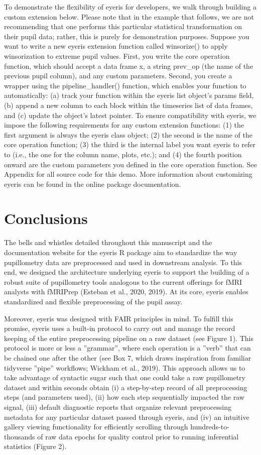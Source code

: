 To demonstrate the flexibility of eyeris for developers, we walk through building a custom extension below. Please note that in the example that follows, we are not recommending that one performs this particular statistical transformation on their pupil data; rather, this is purely for demonstration purposes. Suppose you want to write a new eyeris extension function called winsorize() to apply winsorization to extreme pupil values. First, you write the core operation function, which should accept a data frame x, a string prev\_op (the name of the previous pupil column), and any custom parameters. Second, you create a wrapper using the pipeline\_handler() function, which enables your function to automatically: (a) track your function within the eyeris list object’s params field, (b) append a new column to each block within the timeseries list of data frames, and (c) update the object’s latest pointer. To ensure compatibility with eyeris, we impose the following requirements for any custom extension functions: (1) the first argument is always the eyeris class object; (2) the second is the name of the core operation function; (3) the third is the internal label you want eyeris to refer to (i.e., the one for the column name, plots, etc.); and (4) the fourth position onward are the custom parameters you defined in the core operation function. See Appendix for all source code for this demo. More information about customizing eyeris can be found in the online package documentation.

\section{Conclusions}
The bells and whistles detailed throughout this manuscript and the documentation website for the eyeris R package aim to standardize the way pupillometry data are preprocessed and used in downstream analysis. To this end, we designed the architecture underlying eyeris to support the building of a robust suite of pupillometry tools analogous to the current offerings for fMRI analysts with fMRIPrep (Esteban et al., 2020, 2019). At its core, eyeris enables standardized and flexible preprocessing of the pupil assay.

Moreover, eyeris was designed with FAIR principles in mind. To fulfill this promise, eyeris uses a built-in protocol to carry out and manage the record keeping of the entire preprocessing pipeline on a raw dataset (see Figure 1). This protocol is more or less a ”grammar”, where each operation is a ”verb” that can be chained one after the other (see Box 7, which draws inspiration from familiar tidyverse ”pipe” workflows; Wickham et al., 2019). This approach allows us to take advantage of syntactic sugar such that one could take a raw pupillometry dataset and within seconds obtain (i) a step-by-step record of all preprocessing steps (and parameters used), (ii) how each step sequentially impacted the raw signal, (iii) default diagnostic reports that organize relevant preprocessing metadata for any particular dataset passed through eyeris, and (iv) an intuitive gallery viewing functionality for efficiently scrolling through hundreds-to-thousands of raw data epochs for quality control prior to running inferential statistics (Figure 2).

